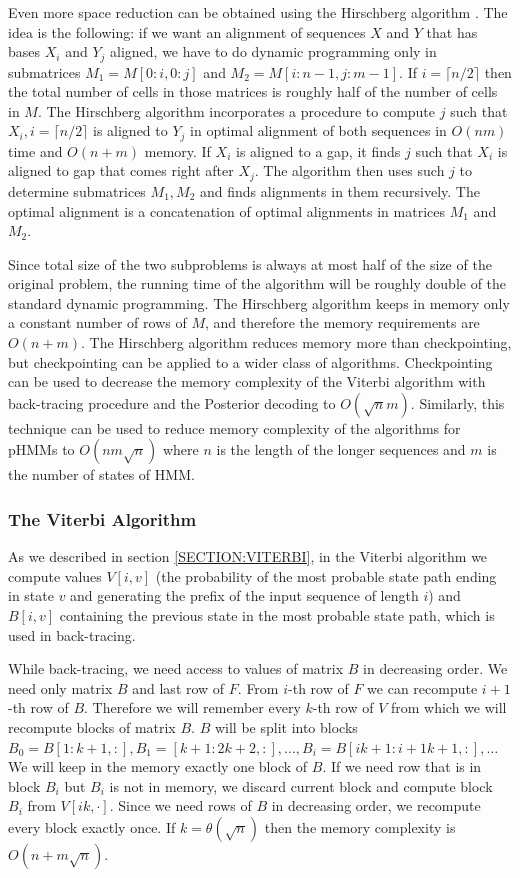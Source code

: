 Even more space reduction can be obtained using the Hirschberg algorithm \cite{Hirschberg1975}. The idea is
the following: if we want an alignment of sequences $X$ and $Y$ that has bases $X_i$
and $Y_j$ aligned, we have to  do dynamic programming only in submatrices
$M_1=M[0:i,0:j]$ and $M_2=M[i:n-1,j:m-1]$. If $i=\lceil n/2\rceil$ then
the total number of cells in those matrices is roughly half of the number of
cells in $M$. The Hirschberg algorithm incorporates a procedure to compute 
$j$ such that $X_i, i=\lceil n/2\rceil$ is aligned to $Y_j$ in optimal alignment of both sequences in $O(nm)$
time and $O(n+m)$ memory. If $X_i$ is aligned to a gap, it finds $j$ such
that $X_i$ is aligned to gap that comes right after $X_j$.
The algorithm then uses such $j$ to determine submatrices $M_1,M_2$ and finds alignments in them recursively.
The optimal alignment is a concatenation of optimal alignments in matrices $M_1$ and
$M_2$.

Since total size of the two subproblems is always at most half of the size of
the original problem, the running time of the algorithm will be roughly double
of the standard dynamic programming.  The Hirschberg algorithm keeps in memory
only a constant number of rows of $M$,  and therefore the memory requirements
are $O(n+m)$. The Hirschberg algorithm reduces memory more than checkpointing,
but checkpointing can be applied to a wider class of algorithms. 
Checkpointing can be used to decrease the memory complexity of the Viterbi
algorithm with back-tracing procedure and the Posterior decoding to $O(\sqrt n
m)$.  Similarly, this technique can be used to reduce memory complexity of the
algorithms for pHMMs to $O(nm\sqrt n )$ where $n$ is the length of the longer
sequences and $m$ is the number of states of HMM.

\subsubsection{The Viterbi Algorithm}
As we described in section \ref{SECTION:VITERBI}, in the Viterbi algorithm we compute values
$V[i, v]$ (the probability of the most probable state path ending in state $v$
and generating the prefix of the input sequence of length $i$) and $B[i, v]$
containing the previous state in the most probable state path, which is used in
back-tracing.

While back-tracing, we need access to values of matrix $B$ in decreasing order.
We need only matrix $B$ and last row of $F$. From $i$-th row of $F$ we can
recompute $i+1$-th row of $B$. Therefore we will remember every $k$-th row of
$V$ from which we will recompute blocks of matrix $B$. $B$ will be split into
blocks $B_0=B[1:k+1,:],B_1=[k+1:2k+2,:],\dots,B_i=B[ik+1:{i+1}k+1,:],\dots$ We
will keep in the memory exactly one block of $B$. If we need row that is in
block $B_i$ but $B_i$ is not in memory, we discard current block and compute
block $B_i$ from $V[ik,\cdot]$. Since we need rows of $B$ in decreasing order,
we recompute every block exactly once. If $k=\theta(\sqrt n)$ then the memory
complexity is  $O(n+m\sqrt n)$.


